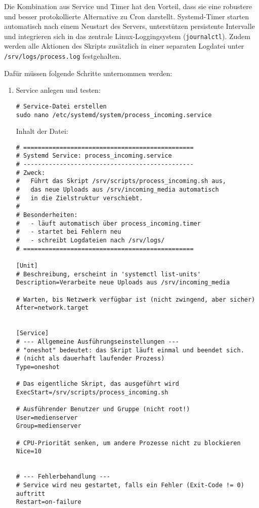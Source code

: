 \documentclass[12pt,a4paper]{report}
\begin{document}
  Die Kombination aus Service und Timer hat den Vorteil, dass sie eine robustere und besser protokollierte Alternative zu Cron darstellt. 
  Systemd-Timer starten automatisch nach einem Neustart des Servers, unterstützen persistente Intervalle und integrieren sich in das zentrale Linux-Loggingsystem (\texttt{journalctl}). 
  Zudem werden alle Aktionen des Skripts zusätzlich in einer separaten Logdatei unter \texttt{/srv/logs/process.log} festgehalten.

  Dafür müssen folgende Schritte unternommen werden:

  \begin{enumerate}
    \item Service anlegen und testen:
    \begin{verbatim}
# Service-Datei erstellen
sudo nano /etc/systemd/system/process_incoming.service
    \end{verbatim}

    Inhalt der Datei:
    \begin{verbatim}
# ===============================================
# Systemd Service: process_incoming.service
# -----------------------------------------------
# Zweck:
#   Führt das Skript /srv/scripts/process_incoming.sh aus,
#   das neue Uploads aus /srv/incoming_media automatisch
#   in die Zielstruktur verschiebt.
#
# Besonderheiten:
#   - läuft automatisch über process_incoming.timer
#   - startet bei Fehlern neu
#   - schreibt Logdateien nach /srv/logs/
# ===============================================

[Unit]
# Beschreibung, erscheint in 'systemctl list-units'
Description=Verarbeite neue Uploads aus /srv/incoming_media

# Warten, bis Netzwerk verfügbar ist (nicht zwingend, aber sicher)
After=network.target


[Service]
# --- Allgemeine Ausführungseinstellungen ---
# "oneshot" bedeutet: das Skript läuft einmal und beendet sich.
# (nicht als dauerhaft laufender Prozess)
Type=oneshot

# Das eigentliche Skript, das ausgeführt wird
ExecStart=/srv/scripts/process_incoming.sh

# Ausführender Benutzer und Gruppe (nicht root!)
User=medienserver
Group=medienserver

# CPU-Priorität senken, um andere Prozesse nicht zu blockieren
Nice=10


# --- Fehlerbehandlung ---
# Service wird neu gestartet, falls ein Fehler (Exit-Code != 0) auftritt
Restart=on-failure


\end{verbatim}
\end{enumerate}
\end{document}
